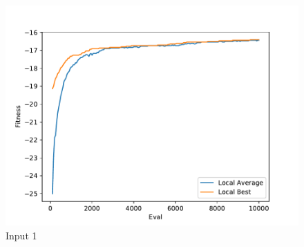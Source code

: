 \documentclass{standalone}
\begin{document}
\begin{figure}[!htb]
	\caption{Input 1}
	\label{fig:graph_1005}
	\includegraphics[width=\textwidth]{../graphs/graphs/1005.pdf}
\end{figure}
\end{document}
